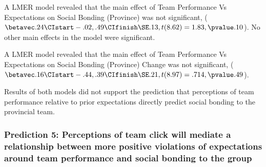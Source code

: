 \begin{CJK}{UTF8}{gbsn}





A LMER model revealed that the main effect of Team Performance Vs Expectations on Social Bonding (Province) was not significant, ($\betavec .24 \CIstart -.02, .49 \CIfinish \SE .13, t(8.62) = 1.83, \pvalue .10$). No other main effects in the model were significant.

 A LMER model revealed that the main effect of Team Performance Vs Expectations on Social Bonding (Province) Change was not significant, ($\betavec .16 \CIstart -.44, .39 \CIfinish \SE .21, t(8.97) = .714, \pvalue .49$).

Results of both models did not support the prediction that perceptions of team performance relative to prior expectations directly predict social bonding to the provincial team.



\subsubsection{Prediction 5: Perceptions of team click will mediate a relationship between more positive violations of expectations around team performance and social bonding to the group}


\end{CJK}
